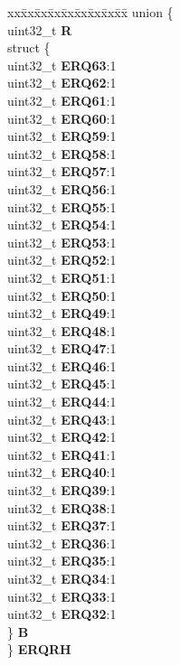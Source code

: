 \begin{DoxyCompactItemize}
\begin{tabbing}
\end{tabbing}\item 
\mbox{\label{structEDMA__tag_a3ad4db11f301810a7039ffb5d4b4a93a}} 
\begin{tabbing}
xx\=xx\=xx\=xx\=xx\=xx\=xx\=xx\=xx\=\kill
union \{\\
\>uint32\_t {\bfseries R}\\
\>struct \{\\
\>\>uint32\_t {\bfseries ERQ63}:1\\
\>\>uint32\_t {\bfseries ERQ62}:1\\
\>\>uint32\_t {\bfseries ERQ61}:1\\
\>\>uint32\_t {\bfseries ERQ60}:1\\
\>\>uint32\_t {\bfseries ERQ59}:1\\
\>\>uint32\_t {\bfseries ERQ58}:1\\
\>\>uint32\_t {\bfseries ERQ57}:1\\
\>\>uint32\_t {\bfseries ERQ56}:1\\
\>\>uint32\_t {\bfseries ERQ55}:1\\
\>\>uint32\_t {\bfseries ERQ54}:1\\
\>\>uint32\_t {\bfseries ERQ53}:1\\
\>\>uint32\_t {\bfseries ERQ52}:1\\
\>\>uint32\_t {\bfseries ERQ51}:1\\
\>\>uint32\_t {\bfseries ERQ50}:1\\
\>\>uint32\_t {\bfseries ERQ49}:1\\
\>\>uint32\_t {\bfseries ERQ48}:1\\
\>\>uint32\_t {\bfseries ERQ47}:1\\
\>\>uint32\_t {\bfseries ERQ46}:1\\
\>\>uint32\_t {\bfseries ERQ45}:1\\
\>\>uint32\_t {\bfseries ERQ44}:1\\
\>\>uint32\_t {\bfseries ERQ43}:1\\
\>\>uint32\_t {\bfseries ERQ42}:1\\
\>\>uint32\_t {\bfseries ERQ41}:1\\
\>\>uint32\_t {\bfseries ERQ40}:1\\
\>\>uint32\_t {\bfseries ERQ39}:1\\
\>\>uint32\_t {\bfseries ERQ38}:1\\
\>\>uint32\_t {\bfseries ERQ37}:1\\
\>\>uint32\_t {\bfseries ERQ36}:1\\
\>\>uint32\_t {\bfseries ERQ35}:1\\
\>\>uint32\_t {\bfseries ERQ34}:1\\
\>\>uint32\_t {\bfseries ERQ33}:1\\
\>\>uint32\_t {\bfseries ERQ32}:1\\
\>\} {\bfseries B}\\
\} {\bfseries ERQRH}\\


\end{tabbing}
\end{DoxyCompactItemize}
